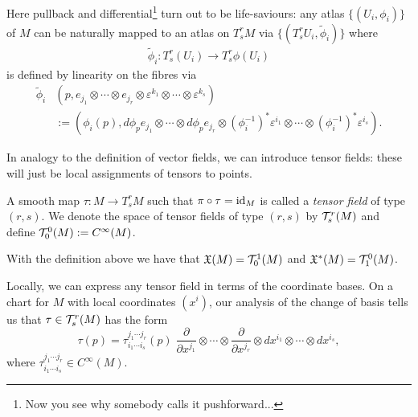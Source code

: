 Here pullback and differential\footnote{Now you see why somebody calls it pushforward...} turn out to be life-saviours:
any atlas $\{(U_i, \phi_i)\}$ of $M$ can be naturally mapped to an atlas  on $T_s^r M$ via $\{(T_s^r U_i, \widetilde\phi_i)\}$ where
\begin{align}
  \widetilde\phi_i : T_s^r(U_i) \to T_s^r\phi(U_i)
\end{align}
is defined by linearity on the fibres via
\begin{align}
  \widetilde\phi_i&(p, e_{j_1}\otimes\cdots\otimes e_{j_r}\otimes \varepsilon^{k_1}\otimes \cdots\otimes \varepsilon^{k_s})\\
  &:=(\phi_i(p), d\phi_p e_{j_1}\otimes\cdots\otimes d\phi_p e_{j_r}\otimes (\phi_i^{-1})^*\varepsilon^{i_1}\otimes \cdots\otimes (\phi_i^{-1})^*\varepsilon^{i_s}).
\end{align}

In analogy to the definition of vector fields, we can introduce tensor fields: these will just be local assignments of tensors to points.

\begin{definition}
  A smooth map $\tau : M \to T_s^r M$ such that $\pi\circ \tau = \operatorname{id}_M$ is called a \emph{tensor field} of type $(r,s)$.
  We denote the space of tensor fields of type $(r,s)$ by $\mathcal{T}_s^r(M)$ and define $\mathcal{T}_0^0(M) := C^\infty(M)$.
\end{definition}

\begin{example}
  With the definition above we have that $\mathfrak{X}(M) = \mathcal{T}_0^1(M)$ and $\mathfrak{X}^*(M) = \mathcal{T}_1^0(M)$.
\end{example}

Locally, we can express any tensor field in terms of the coordinate bases.
On a chart for $M$ with local coordinates $(x^i)$, our analysis of the change of basis tells us that $\tau\in\mathcal{T}_s^r(M)$ has the form
\begin{equation}
  \tau(p) = \tau^{j_1\cdots j_r}_{i_1\cdots i_s}(p)\; \frac{\partial}{\partial x^{j_1}}\otimes\cdots\otimes\frac{\partial}{\partial x^{j_r}}\otimes dx^{i_1}\otimes\cdots\otimes dx^{i_s},
\end{equation}
where $\tau^{j_1\cdots j_r}_{i_1\cdots i_s}\in C^\infty(M)$.

